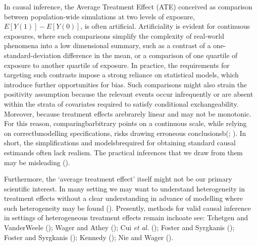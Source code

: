 \documentclass[
  singlecolumn]{article}
\begin{document}
In causal inference, the Average Treatment Effect (ATE) conceived as
comparison between population-wide simulations at two levels of
exposure, \(E[Y(1)] - E[Y(0)]\), is often artificial. Artificiality is
evident for continuous exposures, where such comparisons simplify the
complexity of real-world phenomena into a low dimensional summary, such
as a contrast of a one-standard-deviation difference in the mean, or a
comparison of one quartile of exposure to another quartile of exposure.
In practice, the requirements for targeting such contrasts impose a
strong reliance on statistical models, which introduce further
opportunities for bias. Such comparisons might also strain the
positivity assumption because the relevant events occur infrequently or
are absent within the strata of covariates required to satisfy
conditional exchangeability. Moreover, because treatment effects
arebrarely linear and may not be monotonic. For this reason,
comparingbarbitrary points on a continuous scale, while relying on
correctbmodelling specifications, risks drawing erroneous
conclusionsb(;
). In short, the
simplifications and modelsbrequired for obtaining standard causal
estimands often lack realism. The practical inferences that we draw from
them may be misleading ().

Furthermore, the `average treatment effect' itself might not be our
primary scientific interest. In many setting we may want to understand
heterogeneity in treatment effects without a clear understanding in
advance of modelling where such heterogeneity may be found
(). Presently, methods for
valid causal inference in settings of heterogeneous treatment effects
remain inchoate see: Tchetgen and VanderWeele
(); Wager and Athey
(); Cui \emph{et al.}
(); Foster and Syrgkanis
(); Foster and Syrgkanis
(); Kennedy
(); Nie and Wager
().
\end{document}
